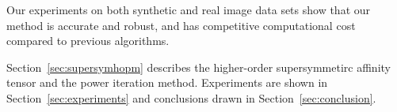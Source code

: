 Our experiments on both synthetic and real image
 data sets show that our method is accurate and robust,
  and has competitive computational cost compared to previous algorithms.

Section~\ref{sec:supersymhopm} describes the higher-order supersymmetirc affinity tensor and the power iteration method. 
Experiments are shown in Section~\ref{sec:experiments} and conclusions drawn in Section~\ref{sec:conclusion}. 